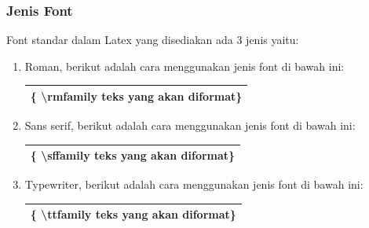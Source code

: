 \subsubsection{Jenis Font}
Font standar dalam Latex yang disediakan ada 3 jenis yaitu:
\begin{enumerate}
\item Roman, berikut adalah cara menggunakan jenis font di bawah ini:\\
\begin{tabular}{|p{12 cm }|}
\hline
\{ \textbackslash rmfamily teks yang akan diformat\}\\
\hline
\end{tabular}
\item Sans serif, berikut adalah cara menggunakan jenis font di bawah ini:\\
\begin{tabular}{|p{12 cm }|}
\hline
\{ \textbackslash sffamily teks yang akan diformat\}\\
\hline
\end{tabular}
\item Typewriter, berikut adalah cara menggunakan jenis font di bawah ini:\\
\begin{tabular}{|p{12 cm }|}
\hline
\{ \textbackslash ttfamily teks yang akan diformat\}\\
\hline
\end{tabular}
\end{enumerate}
